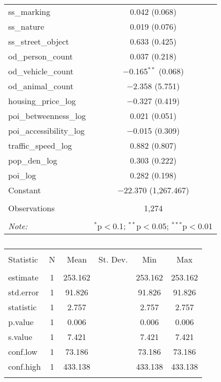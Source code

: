 \begin{table}[!htbp]
\begin{tabular}{@{\extracolsep{1pt}}lc}
  ss\_marking & 0.042 (0.068) \\ 
  ss\_nature & 0.019 (0.076) \\ 
  ss\_street\_object & 0.633 (0.425) \\ 
  od\_person\_count & 0.037 (0.218) \\ 
  od\_vehicle\_count & $-$0.165$^{**}$ (0.068) \\ 
  od\_animal\_count & $-$2.358 (5.751) \\ 
  housing\_price\_log & $-$0.327 (0.419) \\ 
  poi\_betweenness\_log & 0.021 (0.051) \\ 
  poi\_accessibility\_log & $-$0.015 (0.309) \\ 
  traffic\_speed\_log & 0.882 (0.807) \\ 
  pop\_den\_log & 0.303 (0.222) \\ 
  poi\_log & 0.282 (0.198) \\ 
  Constant & $-$22.370 (1,267.467) \\ 
 \hline \\[-1.8ex] 
Observations & 1,274 \\ 
\hline 
\hline \\[-1.8ex] 
\textit{Note:}  & \multicolumn{1}{r}{$^{*}$p$<$0.1; $^{**}$p$<$0.05; $^{***}$p$<$0.01} \\ 
\end{tabular} 
\end{table} 

\begin{table}[!htbp] \centering 
  \caption{} 
  \label{} 
\small 
\begin{tabular}{@{\extracolsep{1pt}}lccccc} 
\\[-1.8ex]\hline 
\hline \\[-1.8ex] 
Statistic & \multicolumn{1}{c}{N} & \multicolumn{1}{c}{Mean} & \multicolumn{1}{c}{St. Dev.} & \multicolumn{1}{c}{Min} & \multicolumn{1}{c}{Max} \\ 
\hline \\[-1.8ex] 
estimate & 1 & 253.162 &  & 253.162 & 253.162 \\ 
std.error & 1 & 91.826 &  & 91.826 & 91.826 \\ 
statistic & 1 & 2.757 &  & 2.757 & 2.757 \\ 
p.value & 1 & 0.006 &  & 0.006 & 0.006 \\ 
s.value & 1 & 7.421 &  & 7.421 & 7.421 \\ 
conf.low & 1 & 73.186 &  & 73.186 & 73.186 \\ 
conf.high & 1 & 433.138 &  & 433.138 & 433.138 \\ 
\hline \\[-1.8ex] 
\end{tabular} 
\end{table} 

